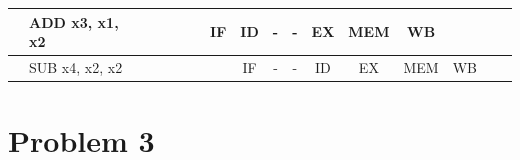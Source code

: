 \documentclass{article}
\begin{document}
\begin{table}[h]
{\begin{tabular}{|l|l|l|l|c|c|c|c|c|c|l|l|l|l|l|l|l|}
    \textbf{}                                & ADD x3, x1, x2        &                         &                         & \multicolumn{1}{l|}{} &                       &                       & IF                    & ID                    & -                     & \multicolumn{1}{c|}{-}  & \multicolumn{1}{c|}{EX}  & \multicolumn{1}{c|}{MEM} & \multicolumn{1}{c|}{WB}  &                         &                          &                         \\ \hline
                                             & SUB x4, x2, x2        &                         &                         & \multicolumn{1}{l|}{} & \multicolumn{1}{l|}{} &                       &                       & IF                    & -                     & \multicolumn{1}{c|}{-}  & \multicolumn{1}{c|}{ID}  & \multicolumn{1}{c|}{EX}  & \multicolumn{1}{c|}{MEM} & \multicolumn{1}{c|}{WB} &                          &                         \\ \hline
    \end{tabular}%
    }
\end{table}

\section*{Problem 3}
\end{document}
